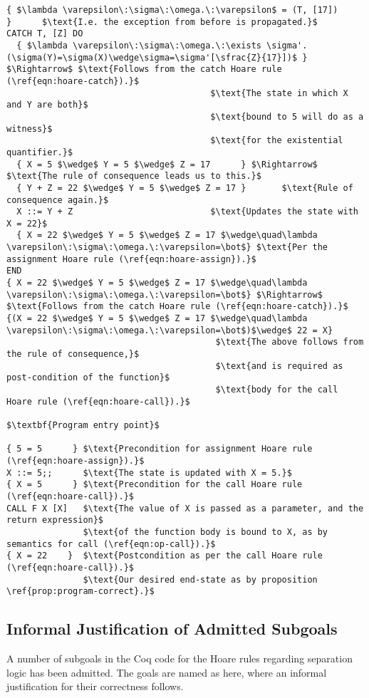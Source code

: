 \begin{lstlisting}[mathescape=true,keepspaces=true,label=lst:hoare_ex_asgn,caption=Decorated variant of the program from listing \ref{lst:imp-plus-ex}.]
  { $\lambda \varepsilon\:\sigma\:\omega.\:\varepsilon$ = (T, [17])          }      $\text{I.e. the exception from before is propagated.}$
CATCH T, [Z] DO
  { $\lambda \varepsilon\:\sigma\:\omega.\:\exists \sigma'.(\sigma(Y)=\sigma(X)\wedge\sigma=\sigma'[\sfrac{Z}{17}])$ } $\Rightarrow$ $\text{Follows from the catch Hoare rule (\ref{eqn:hoare-catch}).}$
                                        $\text{The state in which X and Y are both}$
                                        $\text{bound to 5 will do as a witness}$
                                        $\text{for the existential quantifier.}$
  { X = 5 $\wedge$ Y = 5 $\wedge$ Z = 17      } $\Rightarrow$    $\text{The rule of consequence leads us to this.}$
  { Y + Z = 22 $\wedge$ Y = 5 $\wedge$ Z = 17 }       $\text{Rule of consequence again.}$
  X ::= Y + Z                           $\text{Updates the state with X = 22}$
  { X = 22 $\wedge$ Y = 5 $\wedge$ Z = 17 $\wedge\quad\lambda \varepsilon\:\sigma\:\omega.\:\varepsilon=\bot$} $\text{Per the assignment Hoare rule (\ref{eqn:hoare-assign}).}$
END
{ X = 22 $\wedge$ Y = 5 $\wedge$ Z = 17 $\wedge\quad\lambda \varepsilon\:\sigma\:\omega.\:\varepsilon=\bot$} $\Rightarrow$ $\text{Follows from the catch Hoare rule (\ref{eqn:hoare-catch}).}$
{(X = 22 $\wedge$ Y = 5 $\wedge$ Z = 17 $\wedge\quad\lambda \varepsilon\:\sigma\:\omega.\:\varepsilon=\bot$)$\wedge$ 22 = X}
                                         $\text{The above follows from the rule of consequence,}$
                                         $\text{and is required as post-condition of the function}$
                                         $\text{body for the call Hoare rule (\ref{eqn:hoare-call}).}$

$\textbf{Program entry point}$

{ 5 = 5      } $\text{Precondition for assignment Hoare rule (\ref{eqn:hoare-assign}).}$
X ::= 5;;      $\text{The state is updated with X = 5.}$
{ X = 5      } $\text{Precondition for the call Hoare rule (\ref{eqn:hoare-call}).}$
CALL F X [X]   $\text{The value of X is passed as a parameter, and the return expression}$
               $\text{of the function body is bound to X, as by semantics for call (\ref{eqn:op-call}).}$
{ X = 22    }  $\text{Postcondition as per the call Hoare rule (\ref{eqn:hoare-call}).}$
               $\text{Our desired end-state as by proposition \ref{prop:program-correct}.}$
\end{lstlisting}

\subsection{Informal Justification of Admitted Subgoals}
A number of subgoals in the Coq code for the Hoare rules regarding separation logic has been admitted. The goals are named as here, where an informal justification for their correctness follows.
